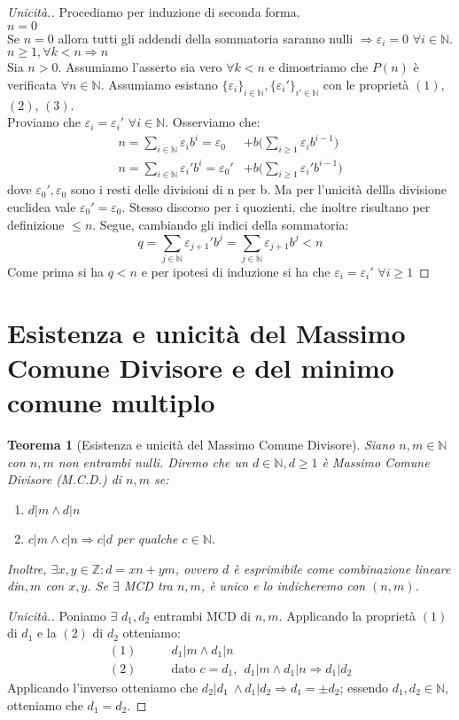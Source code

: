 \documentclass[12pt,twoscolu]{article}
\newcommand{\N}{\mathbb{N}}
\newcommand{\Z}{\mathbb{Z}}
\newcommand{\implica}{\Longrightarrow}
\newcommand{\nin}{\forall n\in\N}
\newcommand{\eps}{\varepsilon}
\renewcommand\qedsymbol{$\blacksquare$}
\newcommand{\baseinduz}[1]{\\[1\baselineskip]{\boldmath$n = #1$}}
\newcommand{\induzdue}[1]{\\[1\baselineskip]{\boldmath$n \ge #1, \forall k < n \implica n$}}
\newtheorem{theorem}{Teorema}
\begin{document}
\renewcommand\qedsymbol{$\blacksquare$}
\begin{proof}[Unicità.]
Procediamo per induzione di seconda forma.
\baseinduz{0}
\\Se $n = 0$ allora tutti gli addendi della sommatoria saranno nulli $\implica \eps_i = 0$ $\forall i \in \N$.
\induzdue{1}
\\Sia $n > 0$. Assumiamo l'asserto sia vero $\forall k < n$ e dimostriamo che $P(n)$ è verificata $\nin$.
Assumiamo esistano $\{\eps_i\}_{i\in\N}, \{\eps_i'\}_{i' \in\N}$ con le proprietà $(1)$, $(2)$, $(3)$.\\Proviamo che $\eps_i = \eps_{i}'$ $\forall i \in \N$. Osserviamo che:
\begin{align*}
n =\sum_{i\in\N} \eps_i b^i = \eps_0 &+ b\Bigg( \sum_{i \ge 1} \eps_i b^{i-1}\Bigg) \\
n =\sum_{i\in\N} \eps_{i}' b^i = \eps_{0}' &+ b\Bigg( \sum_{i \ge 1} \eps_{i}' b^{i-1}\Bigg)
\end{align*}
dove $\eps_{0}',\eps_{0}$ sono i resti delle divisioni di n per b. Ma per l'unicità dellla divisione euclidea vale $\eps_{0}' = \eps_{0}$. Stesso discorso per i quozienti, che inoltre risultano per definizione $\le n$. Segue, cambiando gli indici della sommatoria:
$$q = \sum_{j\in\N} \eps_{j+1}' b^j = \sum_{j\in\N} \eps_{j+1} b^j < n $$
Come prima si ha $q < n$ e per ipotesi di induzione si ha che $\eps_i = \eps_{i}'$ $\forall i \ge 1$
\end{proof}

\section{Esistenza e unicità del Massimo Comune Divisore e del minimo comune multiplo}
\begin{theorem}[Esistenza e unicità del Massimo Comune Divisore]
Siano $n, m \in \N$ con $n, m$ non entrambi nulli. Diremo che un $d \in \N, d \ge 1$ è Massimo Comune Divisore (M.C.D.) di $n, m$ se:
\begin{enumerate}
\item$d | m \land d | n $
\item$c | m \land c | n \implica c | d$ per qualche $c \in \N$.
\end{enumerate}
Inoltre, $\exists x, y \in \Z : d = xn + ym$, ovvero $d$ è esprimibile come combinazione lineare di$n, m$ con $x, y$.  Se $\exists$ MCD tra $n, m$, è unico e lo indicheremo con $(n, m)$.
\end{theorem}

\renewcommand\qedsymbol{$\square$}
\begin{proof}[Unicità.]
Poniamo $\exists$ $d_1, d_2$ entrambi MCD di $n, m$. Applicando la proprietà $(1)$ di $d_1$ e la $(2)$ di $d_2$ otteniamo:
\begin{align*}
(1)\qquad& d_1 | m \land d_1 | n \\
(2)\qquad& \text{dato }c = d_1, \ \ d_1 | m \land d_1 | n \implica d_1 | d_2
\end{align*}
Applicando l'inverso otteniamo che $d_2 | d_1\ \land d_1 | d_2 \implica d_1 = \pm d_2$; essendo $d_1, d_2 \in \N$, otteniamo che
$ d_1 = d_2$.
\end{proof}
\end{document}
